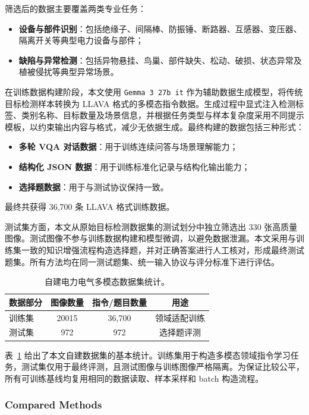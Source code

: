 \documentclass[journal]{IEEEtran}
\begin{document}
筛选后的数据主要覆盖两类专业任务：
\begin{itemize}
    \item \textbf{设备与部件识别}：包括绝缘子、间隔棒、防振锤、断路器、互感器、变压器、隔离开关等典型电力设备与部件；
    \item \textbf{缺陷与异常检测}：包括异物悬挂、鸟巢、部件缺失、松动、破损、状态异常及植被侵扰等典型异常场景。
\end{itemize}

在训练数据构建阶段，本文使用 \texttt{Gemma 3 27b it} 作为辅助数据生成模型，将传统目标检测样本转换为 LLAVA 格式的多模态指令数据。生成过程中显式注入检测标签、类别名称、目标数量及场景信息，并根据任务类型与样本复杂度采用不同提示模板，以约束输出内容与格式，减少无依据生成。最终构建的数据包括三种形式：
\begin{itemize}
    \item \textbf{多轮 VQA 对话数据}：用于训练连续问答与场景理解能力；
    \item \textbf{结构化 JSON 数据}：用于训练标准化记录与结构化输出能力；
    \item \textbf{选择题数据}：用于与测试协议保持一致。
\end{itemize}
最终共获得 36,700 条 LLAVA 格式训练数据。

测试集方面，本文从原始目标检测数据集的测试划分中独立筛选出 330 张高质量图像。测试图像不参与训练数据构建和模型微调，以避免数据泄漏。本文采用与训练集一致的知识增强流程构造选择题，并对正确答案进行人工核对，形成最终测试题集。所有方法均在同一测试题集、统一输入协议与评分标准下进行评估。

\begin{table}[htbp]
\centering
\caption{自建电力电气多模态数据集统计。}
\label{tab:dataset_statistics}
\begin{tabular}{lccc}
\toprule
数据部分 & 图像数量 & 指令/题目数量 & 用途 \\
\midrule
训练集 & 20015 & 36,700 & 领域适配训练 \\
测试集 & 972 & 972 & 选择题评测 \\
\bottomrule
\end{tabular}
\end{table}

表~\ref{tab:dataset_statistics} 给出了本文自建数据集的基本统计。训练集用于构造多模态领域指令学习任务，测试集仅用于最终评测，且测试图像与训练图像严格隔离。为保证比较公平，所有可训练基线均复用相同的数据读取、样本采样和 batch 构造流程。

\subsubsection{Compared Methods}
\end{document}
